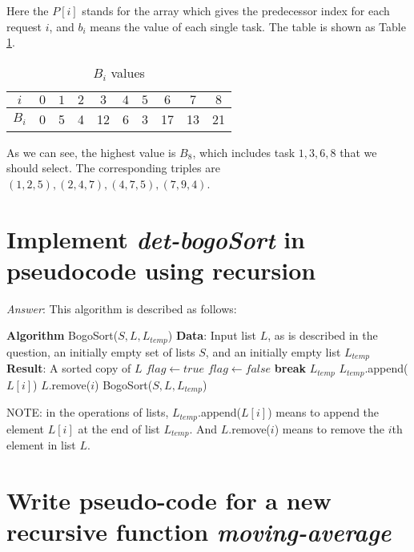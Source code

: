 \documentclass[11pt]{article}
\begin{document}
	Here the $P[i]$ stands for the array which gives the predecessor index for each request $i$, and $b_i$ means the value of each single task. The table is shown as Table \ref{tab:tab1}.
	\begin{table}[!hbp]
		\centering
		\caption{$B_i$ values}
			\begin{tabular}{c|c|c|c|c|c|c|c|c|c}
			\hline 
			\hline
			$i$  &$0 $& $1$ & $2$& $3$& $4$& $5$& $6$& $7$& $8$\\
			\hline
			$B_i$& 0  & 5   & 4  & 12 & 6  & 3  & 17 & 13 &21\\
			\hline
			\hline
			\end{tabular}
		\label{tab:tab1}
	\end{table}
	
	As we can see, the highest value is $B_8$, which includes task $1,3,6,8$ that we should select. The corresponding triples are $(1,2,5), (2,4,7),(4,7,5),(7,9,4)$.
\section{Implement \emph{det-bogoSort} in pseudocode using recursion}
	\emph{Answer}: This algorithm is described as follows:
	\begin{algorithmic}
	\State \textbf{Algorithm} BogoSort($S,L,L_{temp}$)
	\State \textbf{Data}: Input list $L$, as is described in the question, an initially empty set of lists $S$, and an initially empty list $L_{temp}$
	\State \textbf{Result}: A sorted copy of $L$
		\State $flag \gets true$
				\State $flag \gets false$
				\State \textbf{break}
			\EndIf
		\EndFor
			\State \Return $L_{temp}$
		\EndIf
	\Else
			\State $L_{temp}$.append($L[i]$)
			\State $L$.remove($i$)
			\State BogoSort($S,L,L_{temp}$)
		\EndFor
	\EndIf
	\end{algorithmic}
	
	NOTE: in the operations of lists, $L_{temp}$.append($L[i]$) means to append the element $L[i]$ at the end of list $L_{temp}$. And $L$.remove($i$) means to remove the $i$th element in list $L$.
\section{Write pseudo-code for a new recursive function \emph{moving-average}}
\end{document}
